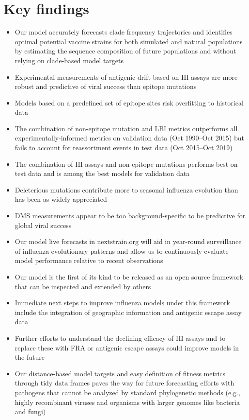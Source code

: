 \section*{Key findings}

\begin{itemize}
\item{Our model accurately forecasts clade frequency trajectories and identifies optimal potential vaccine strains for both simulated and natural populations by estimating the sequence composition of future populations and without relying on clade-based model targets}
\item{Experimental measurements of antigenic drift based on HI assays are more robust and predictive of viral success than epitope mutations}
\item{Models based on a predefined set of epitope sites risk overfitting to historical data}
\item{The combination of non-epitope mutation and LBI metrics outperforms all experimentally-informed metrics on validation data (Oct 1990--Oct 2015) but fails to account for reassortment events in test data (Oct 2015--Oct 2019)}
\item{The combination of HI assays and non-epitope mutations performs best on test data and is among the best models for validation data}
\item{Deleterious mutations contribute more to seasonal influenza evolution than has been as widely appreciated}
\item{DMS measurements appear to be too background-specific to be predictive for global viral success}
\item{Our model live forecasts in nextstrain.org will aid in year-round surveillance of influenza evolutionary patterns and allow us to continuously evaluate model performance relative to recent observations}
\item{Our model is the first of its kind to be released as an open source framework that can be inspected and extended by others}
\item{Immediate next steps to improve influenza models under this framework include the integration of geographic information and antigenic escape assay data}
\item{Further efforts to understand the declining efficacy of HI assays and to replace these with FRA or antigenic escape assays could improve models in the future}
\item{Our distance-based model targets and easy definition of fitness metrics through tidy data frames paves the way for future forecasting efforts with pathogens that cannot be analyzed by standard phylogenetic methods (e.g., highly recombinant viruses and organisms with larger genomes like bacteria and fungi)}
\end{itemize}
